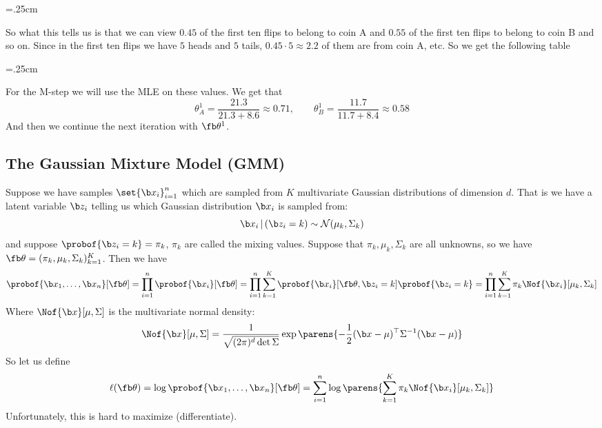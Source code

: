     \centerline{\vbox{\tabskip=.25cm}}

    So what this tells us is that we can view $0.45$ of the first ten flips to belong to coin A and $0.55$ of the first ten flips to belong to coin B and so on.
    Since in the first ten flips we have $5$ heads and $5$ tails, $0.45\cdot5\approx2.2$ of them are from coin A, etc.
    So we get the following table

    \centerline{\vbox{\tabskip=.25cm}}

    For the M-step we will use the MLE on these values.
    We get that
    $$ \theta_A^1 = \frac{21.3}{21.3 + 8.6} \approx 0.71,\qquad \theta_B^1 = \frac{11.7}{11.7 + 8.4} \approx 0.58 $$
    And then we continue the next iteration with $\fb\theta^1$.

\eexam

\subsection{The Gaussian Mixture Model (GMM)}

Suppose we have samples $\set{\b x_i}_{i=1}^n$ which are sampled from $K$ multivariate Gaussian distributions of dimension $d$.
That is we have a latent variable $\b z_i$ telling us which Gaussian distribution $\b x_i$ is sampled from:
$$ \b x_i\,|\,(\b z_i=k) \sim {\cal N}(\mu_k,\Sigma_k) $$
and suppose $\probof{\b z_i=k}=\pi_k$, $\pi_k$ are called the {\emphcolor mixing values}.
Suppose that $\pi_k,\mu_k,\Sigma_k$ are all unknowns, so we have $\fb\theta=(\pi_k,\mu_k,\Sigma_k)_{k=1}^K$.
Then we have
$$ \probof{\b x_1,\dots,\b x_n}[\fb\theta] = \prod_{i=1}^n\probof{\b x_i}[\fb\theta] = \prod_{i=1}^n\sum_{k=1}^K\probof{\b x_i}[\fb\theta,\b z_i=k]\probof{\b z_i=k}
= \prod_{i=1}^n\sum_{k=1}^K\pi_k\Nof{\b x_i}[\mu_k,\Sigma_k] $$
Where $\Nof{\b x}[\mu,\Sigma]$ is the multivariate normal density:
$$ \Nof{\b x}[\mu,\Sigma] = \frac1{\sqrt{(2\pi)^d\det\Sigma}}\exp\parens{-\frac12(\b x-\mu)^\top\Sigma^{-1}(\b x-\mu)} $$
So let us define
$$ \ell(\fb\theta) = \log\probof{\b x_1,\dots,\b x_n}[\fb\theta] = \sum_{i=1}^n\log\parens{\sum_{k=1}^K\pi_k\Nof{\b x_i}[\mu_k,\Sigma_k]} $$
Unfortunately, this is hard to maximize (differentiate).

